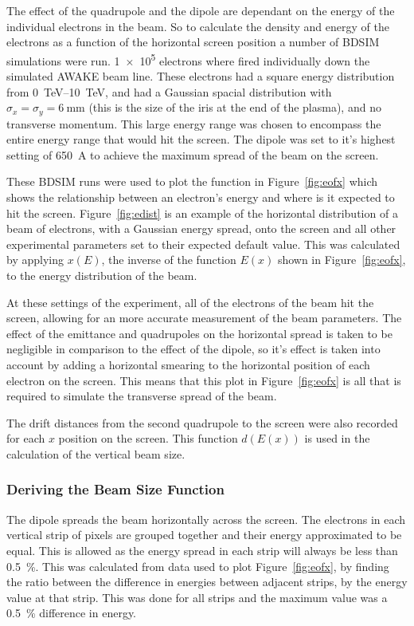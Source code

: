 The effect of the quadrupole and the dipole are dependant on the energy of the
individual electrons in the beam.  So to calculate the density and energy of the
electrons as a function of the horizontal screen position a number of BDSIM
simulations were run. \num{1e5} electrons where fired individually down the
simulated AWAKE beam line. These electrons had a square energy distribution from
\SIrange{0}{10} {\tera\electronvolt}, and had a Gaussian spacial distribution
with \(\sigma_x = \sigma_y = \SI{6}{\milli\meter}\) (this is the size of the
iris at the end of the plasma), and no transverse momentum. This large energy
range was chosen to encompass the entire energy range that would hit the screen.
The dipole was set to it's highest setting of \SI{650}{\ampere} to achieve the
maximum spread of the beam on the screen.

These BDSIM runs were used to plot the function in Figure~\ref{fig:eofx} which
shows the relationship between an electron's energy and where is it expected to
hit the screen. Figure~\ref{fig:edist} is an example of the horizontal
distribution of a beam of electrons, with a Gaussian energy spread, onto the
screen and all other experimental parameters set to their expected default
value. This was calculated by applying \(x(E)\), the inverse of the function
\(E(x)\) shown in Figure~\ref{fig:eofx}, to the energy distribution of the beam.

At these settings of the experiment, all of the electrons of the beam hit the
screen, allowing for an more accurate measurement of the beam parameters.  The
effect of the emittance and quadrupoles on the horizontal spread is taken to be
negligible in comparison to the effect of the dipole, so it's effect is taken
into account by adding a horizontal smearing to the horizontal position of each
electron on the screen. This means that this plot in Figure~\ref{fig:eofx} is
all that is required to simulate the transverse spread of the beam.

The drift distances from the second quadrupole to the screen were also recorded
for each \(x\) position on the screen. This function \(d(E(x))\) is used in the
calculation of the vertical beam size.


\subsubsection{Deriving the Beam Size Function}

The dipole spreads the beam horizontally across the screen. The electrons in
each vertical strip of pixels are grouped together and their energy approximated
to be equal. This is allowed as the energy spread in each strip will always be
less than \SI{0.5}{\percent}. This was calculated from data used to plot
Figure~\ref{fig:eofx}, by finding the ratio between the difference in energies
between adjacent strips, by the energy value at that strip. This was done for
all strips and the maximum value was a \SI{0.5}{\percent} difference in energy.


